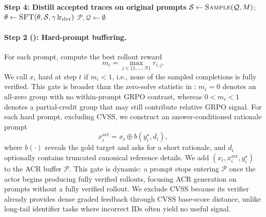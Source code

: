 \begin{algorithm}[t]
\begin{minipage}{0.93\linewidth}
\begin{algorithmic}[1]
    \STATE \textbf{Step 4: Distill accepted traces on original prompts}
      \STATE $\mathcal{S}\gets\textsc{Sample}(\mathcal{Q},M)$;\quad
      $\theta\gets\textsc{SFT}\!\left(\theta,\mathcal{S},\gamma\,\mathrm{lr}_{\mathrm{rlvr}}\right)$
    \ENDIF
    \STATE $\mathcal{P},\mathcal{Q}\gets\emptyset$
  \ENDIF
\ENDFOR
\end{algorithmic}
\vspace{2pt}
\noindent\makebox[\linewidth][l]{\rule{0.86\linewidth}{0.8pt}}\par
\end{minipage}
\end{algorithm}










\paragraph{Step 2 (): Hard-prompt buffering.}
For each prompt, compute the best rollout reward
\begin{equation}
    m_i=\max_{j\in\{1,\ldots,N\}} r_{i,j} .
\end{equation}
We call $x_i$ hard at step $t$ if $m_i<1$, i.e., none of the sampled completions is fully verified. This gate is broader than the zero-solve statistic in : $m_i=0$ denotes an all-zero group with no within-prompt GRPO contrast, whereas $0<m_i<1$ denotes a partial-credit group that may still contribute relative GRPO signal. For each hard prompt, excluding CVSS, we construct an answer-conditioned rationale prompt
\begin{equation}
    x_i^{\mathrm{acr}} = x_i \oplus b(y_i^\star,d_i),
\end{equation}
where $b(\cdot)$ reveals the gold target and asks for a short rationale, and $d_i$ optionally contains truncated canonical reference details. We add $(x_i,x_i^{\mathrm{acr}},y_i^\star)$ to the ACR buffer $\mathcal{P}$. This gate is dynamic: a prompt stops entering $\mathcal{P}$ once the actor begins producing fully verified rollouts, focusing ACR generation on prompts without a fully verified rollout. We exclude CVSS because its verifier already provides dense graded feedback through CVSS base-score distance, unlike long-tail identifier tasks where incorrect IDs often yield no useful signal.

